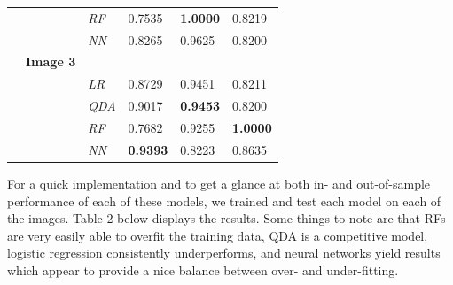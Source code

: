 \documentclass{article}\usepackage[]{graphicx}\usepackage[]{color}
\begin{document}
\begin{table}[h!]
\begin{tabular}{llllll}
\multicolumn{1}{l|}{}                     & \multicolumn{1}{l|}{}                 & \multicolumn{1}{l|}{\textit{RF}}  & \multicolumn{1}{l|}{0.7535}           & \multicolumn{1}{l|}{\textbf{1.0000}}  & \multicolumn{1}{l|}{0.8219}           \\ \cline{2-6} 
\multicolumn{1}{l|}{}                     & \multicolumn{1}{l|}{}                 & \multicolumn{1}{l|}{\textit{NN}}  & \multicolumn{1}{l|}{0.8265}           & \multicolumn{1}{l|}{0.9625}           & \multicolumn{1}{l|}{0.8200}           \\ \cline{2-6} 
\multicolumn{1}{l|}{}                     & \multicolumn{1}{l|}{\textbf{Image 3}} & \multicolumn{1}{l|}{}             & \multicolumn{1}{l|}{}                 & \multicolumn{1}{l|}{}                 & \multicolumn{1}{l|}{}                 \\ \cline{2-6} 
\multicolumn{1}{l|}{}                     & \multicolumn{1}{l|}{\textbf{}}        & \multicolumn{1}{l|}{\textit{LR}}  & \multicolumn{1}{l|}{0.8729}           & \multicolumn{1}{l|}{0.9451}           & \multicolumn{1}{l|}{0.8211}           \\ \cline{2-6} 
\multicolumn{1}{l|}{}                     & \multicolumn{1}{l|}{}                 & \multicolumn{1}{l|}{\textit{QDA}} & \multicolumn{1}{l|}{0.9017}           & \multicolumn{1}{l|}{\textbf{0.9453}}  & \multicolumn{1}{l|}{0.8200}           \\ \cline{2-6} 
\multicolumn{1}{l|}{}                     & \multicolumn{1}{l|}{}                 & \multicolumn{1}{l|}{\textit{RF}}  & \multicolumn{1}{l|}{0.7682}           & \multicolumn{1}{l|}{0.9255}           & \multicolumn{1}{l|}{\textbf{1.0000}}  \\ \cline{2-6} 
\multicolumn{1}{l|}{}                     & \multicolumn{1}{l|}{}                 & \multicolumn{1}{l|}{\textit{NN}}  & \multicolumn{1}{l|}{\textbf{0.9393}}  & \multicolumn{1}{l|}{0.8223}           & \multicolumn{1}{l|}{0.8635}           \\ \cline{2-6} 
\end{tabular}
\end{table}

For a quick implementation and to get a glance at both in- and out-of-sample performance of each of these models, we trained and test each model on each of the images. Table 2 below displays the results. Some things to note are that RFs are very easily able to overfit the training data, QDA is a competitive model, logistic regression consistently underperforms, and neural networks yield results which appear to provide a nice balance between over- and under-fitting. 
\end{document}
